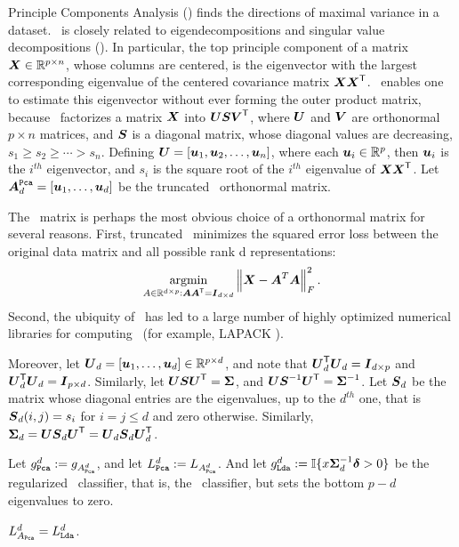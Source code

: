 \documentclass[10pt]{article}
\begin{document}
Principle Components Analysis (\Pca) finds the directions of maximal variance in a dataset.  \Pca~is closely related to eigendecompositions and singular value decompositions (\Svd).  In particular, the top principle component of a matrix $\boldsymbol{X} \in \mathbb{R}^{p \times n}$, whose columns are centered, is the eigenvector with the largest corresponding eigenvalue of the centered covariance matrix $\boldsymbol{X} \boldsymbol{X}^{\mathsf{T}}$.  \Svd~enables one to estimate this eigenvector without ever forming the outer product matrix, because \Svd~factorizes a matrix $\boldsymbol{X}$ into $\boldsymbol{U} \boldsymbol{S} \boldsymbol{V}^{\mathsf{T}}$, where  $\boldsymbol{U}$ and $\boldsymbol{V}$ are orthonormal  ${p \times n}$ matrices, and $\boldsymbol{S}$ is a diagonal matrix, whose diagonal values are decreasing,  $s_1 \geq s_2 \geq \cdots > s_n$.  Defining $\boldsymbol{U} =[\boldsymbol{u}_1, \boldsymbol{u}_2, \ldots, \boldsymbol{u}_n]$, where each $\boldsymbol{u}_i \in \mathbb{R}^p$, then $\boldsymbol{u}_i$ is the $i^{th}$ eigenvector, and $s_i$ is the square root of the $i^{th}$ eigenvalue of $\boldsymbol{X} \boldsymbol{X}^{\mathsf{T}}$.  Let $\boldsymbol{A}^{{\sc \texttt{Pca}}}_d =[\boldsymbol{u}_1, \ldots , \boldsymbol{u}_d]$ be the truncated \Pca~orthonormal matrix.

The \Pca~matrix is perhaps the most obvious choice of a orthonormal matrix for several reasons.  First, truncated \Pca~minimizes the squared error loss between the original data matrix and all possible rank d representations:
\begin{align*}
\argmin_{A \in \Real^{d \times p} : \bA \bA\T = \bI_{d \times d}} \norm{ \bX - \bA^T \bA }_F^2.
\end{align*}
Second, the ubiquity of \Pca~has led to a large number of highly optimized numerical libraries for computing \Pca~(for example, LAPACK \cite{Anderson1999a}). 

Moreover, let $\boldsymbol{U}_d=[\boldsymbol{u}_1,\ldots,\boldsymbol{u}_d] \in \mathbb{R}^{p \times d}$, and note that $\boldsymbol{U}_d^{\mathsf{T}} \boldsymbol{U}_d = \boldsymbol{I}_{d \times p}$ and $\boldsymbol{U}_d^{\mathsf{T}} \boldsymbol{U}_d  = \boldsymbol{I}_{p \times d}$.  Similarly, let $\boldsymbol{U} \boldsymbol{S} \boldsymbol{U}^{\mathsf{T}} = \boldsymbol{\Sigma}$, and $\boldsymbol{U} \boldsymbol{S}^{-1} \boldsymbol{U}^{\mathsf{T}} = \boldsymbol{\Sigma}^{-1}$.  Let $\boldsymbol{S}_d$ be the matrix whose diagonal entries are the eigenvalues, up to the $d^{th}$ one, that is $\boldsymbol{S}_d(i,j)=s_i$ for $i=j \leq d$ and zero otherwise.  Similarly, $\boldsymbol{\Sigma}_d=\boldsymbol{U} \boldsymbol{S}_d \boldsymbol{U}^{\mathsf{T}}=\boldsymbol{U}_d \boldsymbol{S}_d \boldsymbol{U}_d^{\mathsf{T}}$. 

Let $g_{{\sc \texttt{Pca}}}^d:=g_{A_{{\sc \texttt{Pca}}}^d}$, and let $L_{{\sc \texttt{Pca}}}^d:=L_{A_{{\sc \texttt{Pca}}}^d}$.   
And let $g_{{\sc \texttt{Lda}}}^d := \mathbb{I} \{ x \boldsymbol{\Sigma}_d^{-1} \boldsymbol{\delta} > 0\}$ be the regularized \Lda~classifier, that is, the \Lda~classifier, but sets the bottom $p-d$ eigenvalues to zero.

\begin{lem}
$L_{A_{{\sc \texttt{Pca}}}}^d = L_{{\sc \texttt{Lda}}}^d$.
\end{lem}
\end{document}
